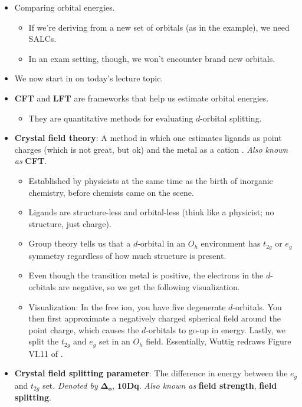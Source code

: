 \documentclass[../notes.tex]{subfiles}
\begin{document}
\begin{itemize}
\begin{itemize}
    \end{itemize}
    \item Comparing orbital energies.
    \begin{itemize}
        \item If we're deriving from a new set of orbitals (as in the  example), we need SALCs.
        \item In an exam setting, though, we won't encounter brand new orbitals.
    \end{itemize}
    \item We now start in on today's lecture topic.
    \item \textbf{CFT} and \textbf{LFT} are frameworks that help us estimate orbital energies.
    \begin{itemize}
        \item They are quantitative methods for evaluating $d$-orbital splitting.
    \end{itemize}
    \item \textbf{Crystal field theory}: A method in which one estimates ligands as point charges (which is not great, but ok) and the metal as a cation . \emph{Also known as} \textbf{CFT}.
    \begin{itemize}
        \item Established by physicists at the same time as the birth of inorganic chemistry, before chemists came on the scene.
        \item Ligands are structure-less and orbital-less (think like a physicist; no structure, just charge).
        \item Group theory tells us that a $d$-orbital in an $O_h$ environment has $t_{2g}$ or $e_g$ symmetry regardless of how much structure is present.
        \item Even though the transition metal  is positive, the electrons in the $d$-orbitals are negative, so we get the following visualization.
        \item Visualization: In the free ion, you have five degenerate $d$-orbitals. You then first approximate a negatively charged spherical field around the point charge, which causes the $d$-orbitals to go-up in energy. Lastly, we split the $t_{2g}$ and $e_g$ set in an $O_h$ field. Essentially, Wuttig redraws Figure VI.11 of \textcite{bib:CHEM20100Notes}.
    \end{itemize}
    \item \textbf{Crystal field splitting parameter}: The difference in energy between the $e_g$ and $t_{2g}$ set. \emph{Denoted by} $\bm{\Delta_o}$, $\bm{10Dq}$. \emph{Also known as} \textbf{field strength}, \textbf{field splitting}.

\end{itemize}
\end{document}
